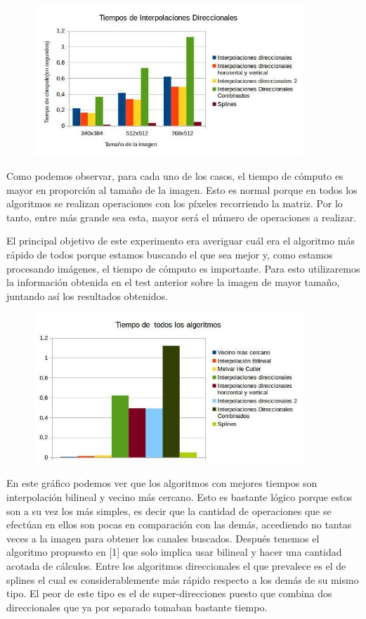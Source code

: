 \documentclass[10pt, a4paper]{article}
\begin{document}
\begin{figure}[H]
  \centering
    \includegraphics[width=0.9\textwidth]{Dir}
\end{figure}

Como podemos observar, para cada uno de los casos, el tiempo de c\'omputo es mayor en proporci\'on al tamaño de la imagen. Esto es normal porque en todos los algoritmos se realizan operaciones con los p\'ixeles recorriendo la matriz. Por lo tanto, entre m\'as grande sea esta, mayor ser\'a el n\'umero de operaciones a realizar. 

El principal objetivo de este experimento era averiguar cu\'al era el algoritmo m\'as r\'apido de todos porque estamos buscando el que sea mejor y, como estamos procesando im\'agenes, el tiempo de c\'omputo es importante. Para esto utilizaremos la informaci\'on obtenida en el test anterior sobre la imagen de mayor tamaño, juntando as\'i los resultados obtenidos. 

\begin{figure}[H]
  \centering
    \includegraphics[width=0.9\textwidth]{Tiemp}
\end{figure}

En este gr\'afico podemos ver que los algoritmos con mejores tiempos son interpolaci\'on bilineal y vecino m\'as cercano. Esto es bastante l\'ogico porque estos son a su vez los m\'as simples, es decir que la cantidad de operaciones que se efect\'uan en ellos son pocas en comparaci\'on con las dem\'as, accediendo no tantas veces a la imagen para obtener los canales buscados. Despu\'es tenemos el algoritmo propuesto en [1] que solo implica usar bilineal y hacer una cantidad acotada de c\'alculos. Entre los algoritmos direccionales el que prevalece es el de splines el cual es considerablemente m\'as r\'apido respecto a los dem\'as de su mismo tipo. El peor de este tipo es el de super-direcciones puesto que combina dos direccionales que ya por separado tomaban bastante tiempo. 
\end{document}
